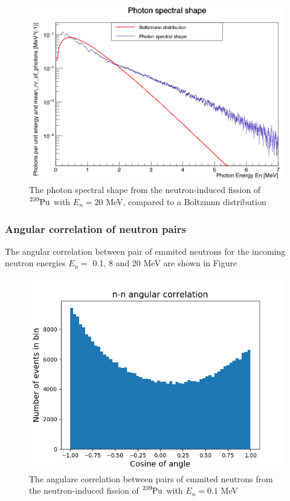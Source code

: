 \documentclass[]{article}
\begin{document}
\begin{figure} [H]
	\centering
	\includegraphics[scale=0.36]{Pu239_20_ph_spectral_shape.png}
	\caption{The photon spectral shape from the neutron-induced fission of $\ce{^{239}Pu}$ with $E_n = 20$ MeV, compared to a Boltzmnn distribution}
	\label{fig:Pu239_20_ph_spectral_shape}
\end{figure}

\subsubsection{Angular correlation of neutron pairs}
The angular correlation between pair of emmited neutrons for the incoming neutron energies $E_n =$ 0.1, 8 and 20 MeV are shown in Figure

\begin{figure} [H]
	\centering
	\includegraphics[scale=0.65]{Pu239_0_1_n_n_ang_corr.png}
	\caption{The angulare correlation between pairs of emmited neutrons from the neutron-induced fission of $\ce{^{239}Pu}$ with $E_n= 0.1$ MeV}
	\label{fig:Pu239_0_1_n_n_ang_corr}
\end{figure}
\end{document}
